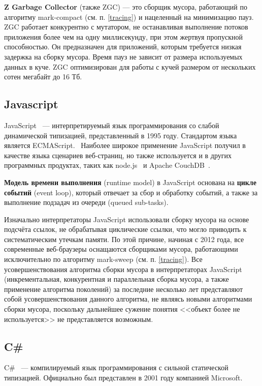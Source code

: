 \textbf{Z Garbage Collector} (также ZGC) --- это сборщик мусора, работающий по алгоритму mark-compact (см. п. \ref{tracing}) и нацеленный на минимизацию пауз. ZGC работает конкурентно с мутатором, не останавливая выполнение потоков приложения более чем на одну миллисекунду, при этом жертвуя пропускной способностью. Он предназначен для приложений, которым требуется низкая задержка на сборку мусора. Время пауз не зависит от размера используемых данных в куче. ZGC оптимизирован для работы с кучей размером от нескольких сотен мегабайт до 16 Тб.~\cite{java_zgc}

\subsection*{Javascript}

JavaScript~\cite{js} --- интерпретируемый язык программирования со слабой динамической типизацией, представленный в 1995 году. Стандартом языка является ECMAScript.~\cite{ecmascript} Наиболее широкое применение JavaScript получил в качестве языка сценариев веб-страниц, но также используется и в других программных продуктах, таких как node.js~\cite{node_js} и Apache CouchDB~\cite{couchdb}.

\textbf{Модель времени выполнения} (runtime model) в JavaScript основана на \textbf{цикле событий} (event loop), который отвечает за сбор и обработку событий, а также за выполнение подзадач из очереди (queued sub-tasks).~\cite{js_event_loop}

Изначально интерпретаторы JavaScript использовали сборку мусора на основе подсчёта ссылок, не обрабатывая циклические ссылки, что могло приводить к систематическим утечкам памяти. По этой причине, начиная с 2012 года, все современные веб-браузеры оснащаются сборщиками мусора, работающими исключительно по алгоритму mark-sweep (см. п. \ref{tracing}). Все усовершенствования алгоритма сборки мусора в интерпретаторах JavaScript (инкрементальная, конкурентная и параллельная сборка мусора, а также применение алгоритма поколений) за последние несколько лет представляют собой усовершенствования данного алгоритма, не являясь новыми алгоритмами сборки мусора, поскольку дальнейшее сужение понятия <<объект более не используется>> не представляется возможным.~\cite{js_memory}

\subsection*{C\#}

C\#~\cite{dotnet_tour} --- компилируемый язык программирования с сильной статической типизацией. Официально был представлен в 2001 году компанией Microsoft.

